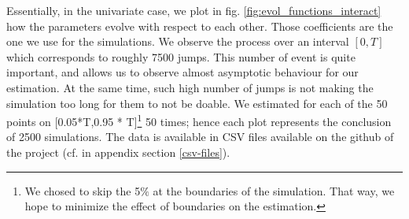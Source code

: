 \documentclass[11pt]{book}
\begin{document}
Essentially, in the univariate case, we plot in fig. \ref{fig:evol_functions_interact} how the parameters evolve with respect to each other. Those coefficients are the one we use for the simulations. We observe the process over an interval $[0,T]$ which corresponds to roughly 7500 jumps. This number of event is quite important, and allows us to observe almost asymptotic behaviour for our estimation. At the same time, such high number of jumps is not making the simulation too long for them to not be doable. We estimated for each of the 50 points on [0.05*T,0.95 * T]\footnote{We chosed to skip the 5$\%$ at the boundaries of the simulation. That way, we hope to minimize the effect of boundaries on the estimation.}  50 times; hence each plot represents the conclusion of 2500 simulations. The data is available in CSV files available on the github of the project (cf. in appendix section \ref{csv-files}).
\end{document}

